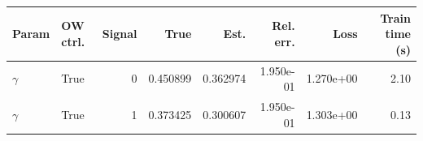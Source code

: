 \begin{tabular}{llrrrrrr}
\hline
Param & OW ctrl. & Signal & True & Est. & Rel. err. & Loss & Train time (s) \\
\hline
$\gamma$ & True & 0 & 0.450899 & 0.362974 & 1.950e-01 & 1.270e+00 & 2.10 \\
$\gamma$ & True & 1 & 0.373425 & 0.300607 & 1.950e-01 & 1.303e+00 & 0.13 \\
\hline
\end{tabular}
